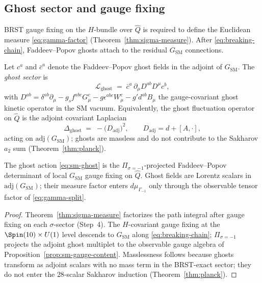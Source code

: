 \subsection{Ghost sector and gauge fixing}
\label{sec:sm-lagrangian:ghost}

BRST gauge fixing on the $H$-bundle over $\hat Q$ is required to define the
Euclidean measure \eqref{eq:gamma-factor} (Theorem~\ref{thm:sigma-measure}).
After \eqref{eq:breaking-chain}, Faddeev--Popov ghosts attach to the residual
$G_{\mathrm{SM}}$ connections.

\begin{definition}\label{def:sm-ghost}
Let $c^a$ and $\bar c^a$ denote the Faddeev--Popov ghost fields in the adjoint
of $G_{\mathrm{SM}}$. The \emph{ghost sector} is
\begin{equation}\label{eq:sm-ghost}
  \mathcal{L}_{\mathrm{ghost}}
  \;=\;
  \bar c^a\,\partial_\mu D^{ab} D^\mu c^b,
\end{equation}
with $D^{ab}=\delta^{ab}\partial_\mu-g_sf^{abc}G_\mu^c-g\epsilon^{abc}W_\mu^c
-g'd^{ab}B_\mu$ the gauge-covariant ghost kinetic operator in the SM vacuum.
Equivalently, the ghost fluctuation operator on $\hat Q$ is the adjoint
covariant Laplacian
\begin{equation}\label{eq:sm-ghost-operator}
  \Delta_{\mathrm{ghost}}
  \;=\;
  -\bigl(D_{\mathrm{adj}}\bigr)^2,
  \qquad
  D_{\mathrm{adj}}=d+[A,\cdot],
\end{equation}
acting on $\mathrm{adj}(G_{\mathrm{SM}})$; ghosts are massless and do not
contribute to the Sakharov $a_2$ sum (Theorem~\ref{thm:planck}).
\end{definition}

\begin{lemma}[Ghost sector from $\Pi_{\sigma=-1}$ gauge fixing]
\label{lem:sm-ghost-derived}
The ghost action \eqref{eq:sm-ghost} is the $\Pi_{\sigma=-1}$-projected
Faddeev--Popov determinant of local $G_{\mathrm{SM}}$ gauge fixing on
$\hat Q$. Ghost fields are Lorentz scalars in $\mathrm{adj}(G_{\mathrm{SM}})$;
their measure factor enters $d\mu_{\Gamma_{-1}}$ only through the observable
tensor factor of \eqref{eq:gamma-split}.
\end{lemma}

\begin{proof}
Theorem~\ref{thm:sigma-measure} factorizes the path integral after gauge
fixing on each $\sigma$-sector (Step~4). The $H$-covariant gauge fixing at the
$\Spin(10)\times U(1)$ level descends to $G_{\mathrm{SM}}$ along
\eqref{eq:breaking-chain}; $\Pi_{\sigma=-1}$ projects the adjoint ghost
multiplet to the observable gauge algebra of
Proposition~\ref{prop:sm-gauge-content}. Masslessness follows because ghosts
transform as adjoint scalars with no mass term in the BRST-exact sector; they
do not enter the $28$-scalar Sakharov induction (Theorem~\ref{thm:planck}).
\end{proof}

